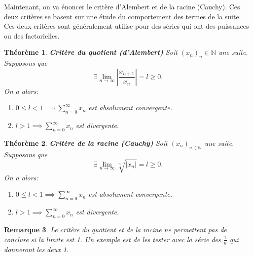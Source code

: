 \documentclass[a4paper, 12pt, french, twoside]{article}
\newtheorem{theorem}{Théorème}[section]
\newtheorem{rem}[theorem]{Remarque}
\newcommand{\Nn}{{\mathbb{N}}}
\begin{document}
Maintenant, on va énoncer le critère d'Alembert et de la racine (Cauchy).
Ces deux critères se basent sur une étude du comportement des termes de la suite. Ces deux critères sont généralement utilise pour des séries qui ont des puissances ou des factorielles.

\begin{theorem}{\textbf{Critère du quotient (d'Alembert)}}
    Soit $(x_n)_n\in\Nn$ une suite. Supposons que
    \begin{equation}
        \exists \lim_{n\rightarrow\infty} \left|\frac{x_{n+1}}{x_n}\right|=l\geq 0.
    \end{equation}
    On a alors:
    \begin{enumerate}
        \item $0\leq l<1 \implies \sum_{n=0}^\infty x_n$ est absolument convergente.
        \item $l>1 \implies \sum_{n=0}^\infty x_n$ est divergente.
    \end{enumerate}
\end{theorem}



\begin{theorem}{\textbf{Critère de la racine (Cauchy)}}
    Soit $(x_n)_{n\in\Nn}$ une suite. Supposons que
    \begin{equation}
        \exists \lim_{n\rightarrow\infty} \sqrt[n]{|x_n|}=l\geq0.
    \end{equation}
    On a alors:
    \begin{enumerate}
        \item $0\leq l<1 \implies \sum_{n=0}^\infty x_n$ est absolument convergente.
        \item $l>1 \implies \sum_{n=0}^\infty x_n$ est divergente.
    \end{enumerate}
\end{theorem}

\begin{rem}
    Le critère du quotient et de la racine ne permettent pas de conclure si la limite est 1. Un exemple est de les tester avec la série des $\frac{1}{n}$ qui donneront les deux 1.
\end{rem}
\end{document}
